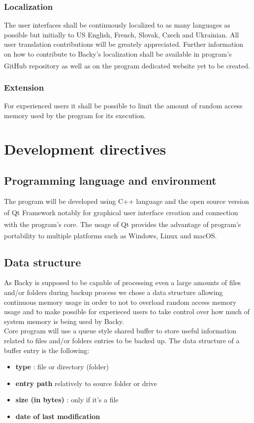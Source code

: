 \documentclass[a4paper]{article}
\begin{document}
      \subsubsection{Localization}
        The user interfaces shall be continuously localized to as many languages as possible but initially to US English, French, Slovak, Czech and Ukrainian. All user translation contributions will be greately appreciated. Further information on how to contribute to Backy's localization shall be available in program's GitHub\textsuperscript{\textregistered} repository as well as on the program dedicated website yet to be created.
      \subsubsection{Extension}
        For experienced users it shall be possible to limit the amount of random access memory used by the program for its execution.
  \section{Development directives}
    \subsection{Programming language and environment}
      The program will be developed using C++ language and the open source version of Qt\textsuperscript{\textregistered} Framework notably for graphical user interface creation and connection with the program's core. The usage of Qt\textsuperscript{\textregistered} provides the advantage of program's portability to multiple platforms such as Windows\textsuperscript{\textregistered}, Linux\textsuperscript{\textregistered} and macOS\textsuperscript{\textregistered}.
    \subsection{Data structure}
      As Backy is supposed to be capable of processing even a large amounts of files and/or folders during backup process we chose a data structure allowing continuous memory usage in order to not to overload random access memory usage and to make possible for experieced users to take control over how much of system memory is being used by Backy. \\
      \indent Core program will use a queue style shared buffer to store useful information related to files and/or folders entries to be backed up. The data structure of a buffer entry is the following:
      \begin{itemize}
        \item \textbf{type} : file or directory (folder)
        \item \textbf{entry path} relatively to source folder or drive
        \item \textbf{size (in bytes)} : only if it's a file
        \item \textbf{date of last modification}
      \end{itemize}
\end{document}
